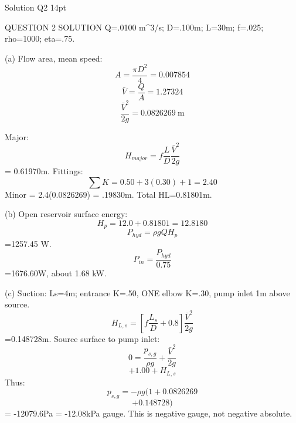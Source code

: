 Solution Q2 14pt

QUESTION 2 SOLUTION
Q=.0100 m^3/s; D=.100m; L=30m; f=.025; rho=1000; eta=.75.

(a) Flow area, mean speed:
$$A=\frac{\pi D^2}{4}=0.007854$$
$$\bar V=\frac{Q}{A}=1.27324$$
$$\frac{\bar V^2}{2g}=0.0826269\ \text{m}$$

Major:
$$H_{major}=f\frac{L}{D}\frac{\bar V^2}{2g}$$
= 0.61970m.
Fittings:
$$\sum K=0.50+3(0.30)+1=2.40$$
Minor = 2.4(0.0826269) = .19830m.
Total HL=0.81801m.

(b) Open reservoir surface energy:
$$H_p=12.0+0.81801=12.8180$$
$$P_{hyd}=\rho gQH_p$$
=1257.45 W.
$$P_{in}=\frac{P_{hyd}}{0.75}$$
=1676.60W, about 1.68 kW.

(c) Suction: Ls=4m; entrance K=.50, ONE elbow K=.30, pump inlet 1m above source.
$$H_{L,s}=[f\frac{L_s}{D}+0.8]\frac{\bar V^2}{2g}$$
=0.148728m.
Source surface to pump inlet:
$$0=\frac{p_{s,g}}{\rho g}+\frac{\bar V^2}{2g}$$
$$+1.00+H_{L,s}$$
Thus:
$$p_{s,g}=-\rho g(1+0.0826269$$
$$+0.148728)$$
= -12079.6Pa = -12.08kPa gauge.
This is negative gauge, not negative absolute.
